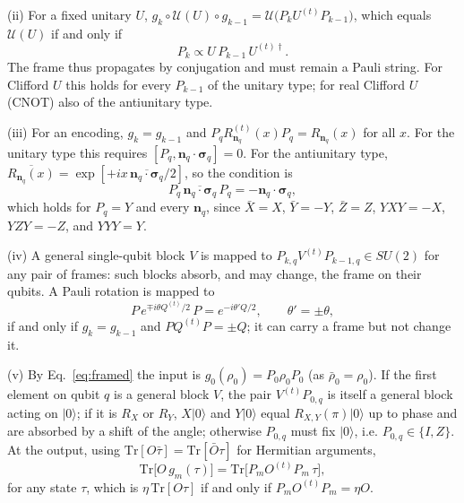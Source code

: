 \documentclass[
 aps,pra,
 twocolumn,
 superscriptaddress,
 longbibliography,
 nofootinbib
]{revtex4-2}
\newcommand{\Tr}{\mathrm{Tr}}
\providecommand{\ket}[1]{\lvert #1 \rangle}
\begin{document}
(ii) For a fixed unitary $U$, $g_k\circ\mathcal U(U)\circ g_{k-1}=\mathcal U\bigl(P_kU^{(t)}P_{k-1}\bigr)$, which
equals $\mathcal U(U)$ if and only if
\begin{equation}
P_k\propto U\,P_{k-1}\,U^{(t)\dagger} .
\label{eq:app_ii}
\end{equation}
The frame thus propagates by conjugation and must remain a Pauli string. For Clifford $U$ this
holds for every $P_{k-1}$ of the unitary type; for real Clifford $U$ (CNOT) also of the
antiunitary type.

(iii) For an encoding, $g_k=g_{k-1}$ and $P_q R^{(t)}_{\mathbf n_q}(x)P_q=R_{\mathbf n_q}(x)$ for
all $x$. For the unitary type this requires $[P_q,\mathbf n_q\cdot\boldsymbol\sigma_q]=0$. For
the antiunitary type, $\overline{R_{\mathbf n_q}(x)}=\exp[+ix\,\overline{\mathbf n_q\cdot\boldsymbol\sigma_q}/2]$,
so the condition is
\begin{equation}
P_q\,\overline{\mathbf n_q\cdot\boldsymbol\sigma_q}\,P_q=-\mathbf n_q\cdot\boldsymbol\sigma_q ,
\label{eq:app_iii}
\end{equation}
which holds for $P_q=Y$ and every $\mathbf n_q$, since $\bar X=X$, $\bar Y=-Y$, $\bar Z=Z$,
$YXY=-X$, $YZY=-Z$, and $YYY=Y$.

(iv) A general single-qubit block $V$ is mapped to $P_{k,q}V^{(t)}P_{k-1,q}\in SU(2)$ for any
pair of frames: such blocks absorb, and may change, the frame on their qubits. A Pauli
rotation is mapped to
\begin{equation}
P\,e^{\mp i\theta Q^{(t)}/2}\,P=e^{-i\theta' Q/2},\qquad \theta'=\pm\theta ,
\label{eq:app_iv}
\end{equation}
if and only if $g_k=g_{k-1}$ and $PQ^{(t)}P=\pm Q$; it can carry a frame but not change it.

(v) By Eq.~\eqref{eq:framed} the input is $g_0(\rho_0)=P_0\rho_0P_0$ (as $\bar\rho_0=\rho_0$).
If the first element on qubit $q$ is a general block $V$, the pair $V^{(t)}P_{0,q}$ is itself
a general block acting on $\ket 0$; if it is $R_X$ or $R_Y$, $X\ket0$ and $Y\ket0$ equal
$R_{X,Y}(\pi)\ket0$ up to phase and are absorbed by a shift of the angle; otherwise $P_{0,q}$
must fix $\ket0$, i.e. $P_{0,q}\in\{I,Z\}$. At the output, using
$\Tr[O\bar\tau]=\Tr[\bar O\tau]$ for Hermitian arguments,
\begin{equation}
\Tr\bigl[O\,g_m(\tau)\bigr]=\Tr\bigl[P_mO^{(t)}P_m\,\tau\bigr],
\label{eq:app_v}
\end{equation}
for any state $\tau$, which is $\eta\,\Tr[O\tau]$ if and only if $P_mO^{(t)}P_m=\eta O$.
\end{document}
